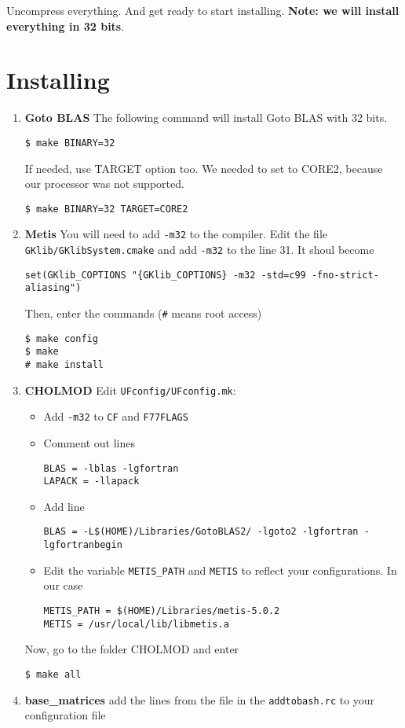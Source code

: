 \documentclass[letterpaper,11pt]{article}
\numberwithin{equation}{section}
\newcommand{\makesec}[1]{\section[#1]{#1}}
\begin{document}
Uncompress everything. And get ready to start installing. {\bf Note: we will install everything in 32 bits}.

\makesec{Installing}

\begin{enumerate}
 \item {\bf Goto BLAS} The following command will install Goto BLAS with 32 bits.
\begin{verbatim}
$ make BINARY=32
\end{verbatim}
If needed, use TARGET option too. We needed to set to CORE2, because our processor was not supported.
\begin{verbatim}
$ make BINARY=32 TARGET=CORE2
\end{verbatim}
 \item {\bf Metis} You will need to add \verb+-m32+ to the compiler. Edit the file \verb+GKlib/GKlibSystem.cmake+ and add \verb+-m32+ to the line 31. It shoul become
\begin{verbatim}
set(GKlib_COPTIONS "{GKlib_COPTIONS} -m32 -std=c99 -fno-strict-aliasing")
\end{verbatim}
Then, enter the commands (\verb+#+ means root access)
\begin{verbatim}
$ make config
$ make
# make install
\end{verbatim}
 \item {\bf CHOLMOD} Edit \verb+UFconfig/UFconfig.mk+:
  \begin{itemize}
   \item Add \verb+-m32+ to \verb+CF+ and \verb+F77FLAGS+
   \item Comment out lines
\begin{verbatim}
BLAS = -lblas -lgfortran
LAPACK = -llapack
\end{verbatim}
   \item Add line
\begin{verbatim}
BLAS = -L$(HOME)/Libraries/GotoBLAS2/ -lgoto2 -lgfortran -lgfortranbegin 
\end{verbatim}
  \item Edit the variable \verb+METIS_PATH+ and \verb+METIS+ to reflect your configurations. In our case
    \begin{verbatim} 
METIS_PATH = $(HOME)/Libraries/metis-5.0.2
METIS = /usr/local/lib/libmetis.a
    \end{verbatim}
  \end{itemize}
  Now, go to the folder CHOLMOD and enter
\begin{verbatim}
$ make all
\end{verbatim}
 \item {\bf base\_matrices} add the lines from the file in the \verb+addtobash.rc+ to your configuration file 


\end{enumerate}
\end{document}

